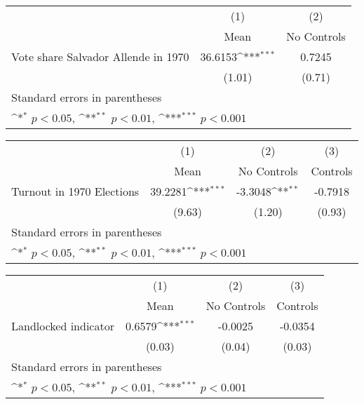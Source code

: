 {
\def\sym#1{\ifmmode^{#1}\else\(^{#1}\)\fi}
\begin{tabular}{l*{2}{c}}
\hline\hline
                    &\multicolumn{1}{c}{(1)}&\multicolumn{1}{c}{(2)}\\
                    &\multicolumn{1}{c}{Mean}&\multicolumn{1}{c}{No Controls}\\
\hline
Vote share Salvador Allende in 1970&     36.6153\sym{***}&      0.7245         \\
                    &      (1.01)         &      (0.71)         \\
\hline\hline
\multicolumn{3}{l}{\footnotesize Standard errors in parentheses}\\
\multicolumn{3}{l}{\footnotesize \sym{*} \(p<0.05\), \sym{**} \(p<0.01\), \sym{***} \(p<0.001\)}\\
\end{tabular}
}
{
\def\sym#1{\ifmmode^{#1}\else\(^{#1}\)\fi}
\begin{tabular}{l*{3}{c}}
\hline\hline
                    &\multicolumn{1}{c}{(1)}&\multicolumn{1}{c}{(2)}&\multicolumn{1}{c}{(3)}\\
                    &\multicolumn{1}{c}{Mean}&\multicolumn{1}{c}{No Controls}&\multicolumn{1}{c}{Controls}\\
\hline
Turnout in 1970 Elections&     39.2281\sym{***}&     -3.3048\sym{**} &     -0.7918         \\
                    &      (9.63)         &      (1.20)         &      (0.93)         \\
\hline\hline
\multicolumn{4}{l}{\footnotesize Standard errors in parentheses}\\
\multicolumn{4}{l}{\footnotesize \sym{*} \(p<0.05\), \sym{**} \(p<0.01\), \sym{***} \(p<0.001\)}\\
\end{tabular}
}
{
\def\sym#1{\ifmmode^{#1}\else\(^{#1}\)\fi}
\begin{tabular}{l*{3}{c}}
\hline\hline
                    &\multicolumn{1}{c}{(1)}&\multicolumn{1}{c}{(2)}&\multicolumn{1}{c}{(3)}\\
                    &\multicolumn{1}{c}{Mean}&\multicolumn{1}{c}{No Controls}&\multicolumn{1}{c}{Controls}\\
\hline
Landlocked indicator&      0.6579\sym{***}&     -0.0025         &     -0.0354         \\
                    &      (0.03)         &      (0.04)         &      (0.03)         \\
\hline\hline
\multicolumn{4}{l}{\footnotesize Standard errors in parentheses}\\
\multicolumn{4}{l}{\footnotesize \sym{*} \(p<0.05\), \sym{**} \(p<0.01\), \sym{***} \(p<0.001\)}\\
\end{tabular}
}
